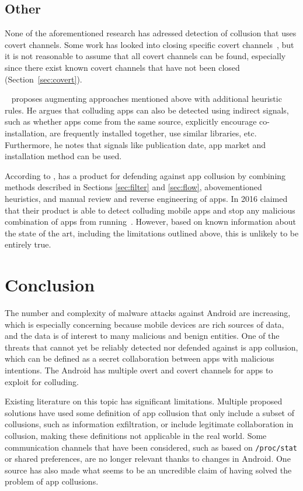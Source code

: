 \documentclass[article]{aaltoseries}
\newcommand{\Sref}[1]{Section~\ref{#1}}
\renewcommand\gls\cgls
\begin{document}
\subsection{Other}
\label{sec:othermethods}

None of the aforementioned research has adressed detection of collusion that uses covert channels. Some work has looked into closing specific covert channels~\cite{nn2017,Qi2018}, but it is not reasonable to assume that all covert channels can be found, especially since there exist known covert channels that have not been closed (\Sref{sec:covert}).

\citeauthor{Muttik2016}~\cite{Muttik2016} proposes augmenting approaches mentioned above with additional heuristic rules. He argues that colluding apps can also be detected using indirect signals, such as whether apps come from the same source, explicitly encourage co-installation, are frequently installed together, use similar libraries, etc. Furthermore, he notes that signals like publication date, app market and installation method can be used. 

According to \citeauthor{Muttik2016}, \citeauthor{McAfee2016} has a product for defending against app collusion by combining methods described in Sections \ref{sec:filter} and \ref{sec:flow}, abovementioned heuristics, and manual review and reverse engineering of apps. In 2016 \citeauthor{McAfee2016} claimed that their product is able to detect colluding mobile apps and stop any malicious combination of apps from running~\cite{McAfee2016}. However, based on known information about the state of the art, including the limitations outlined above, this is unlikely to be entirely true.

\section{Conclusion}
\label{sec:conclusion}

The number and complexity of malware attacks against Android are increasing, which is especially concerning because mobile devices are rich sources of data, and the data is of interest to many malicious and benign entities. One of the threats that cannot yet be reliably detected nor defended against is app collusion, which can be defined as a secret collaboration between apps with malicious intentions. The Android \gls{os} has multiple overt and covert channels for apps to exploit for colluding.

Existing literature on this topic has significant limitations. Multiple proposed solutions have used some definition of app collusion that only include a subset of collusions, such as information exfiltration, or include legitimate collaboration in collusion, making these definitions not applicable in the real world. Some communication channels that have been considered, such as based on \texttt{/proc/stat} or shared preferences, are no longer relevant thanks to changes in Android. One source has also made what seems to be an uncredible claim of having solved the problem of app collusions.
\end{document}
